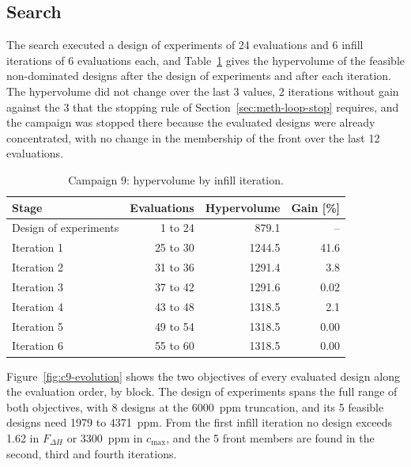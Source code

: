 \subsection{Search}
\label{sec:res-c9-search}\label{sec:res-c9-convergence}
\label{fig:c9-hv}\label{fig:c9-learning}\label{fig:c9-front-stability}

The search executed a design of experiments of 24 evaluations and 6
infill iterations of 6 evaluations each, and Table~\ref{tab:c9-hv} gives
the hypervolume of the feasible non-dominated designs after the design
of experiments and after each iteration. The hypervolume did not change over the last 3 values, 2 iterations
without gain against the 3 that the stopping rule of
Section~\ref{sec:meth-loop-stop} requires, and the campaign was stopped
there because the evaluated designs were already concentrated, with no
change in the membership of the front over the last 12 evaluations.

\begin{table}[htbp]
  \centering
  \small
  \caption{Campaign 9: hypervolume by infill iteration.}
  \label{tab:c9-hv}
  \begin{tabular}{@{}lrrr@{}}
    \toprule
    Stage & Evaluations & Hypervolume & Gain [\%] \\
    \midrule
    Design of experiments & 1 to 24 & 879.1 & -- \\
    Iteration 1 & 25 to 30 & 1244.5 & 41.6 \\
    Iteration 2 & 31 to 36 & 1291.4 & 3.8 \\
    Iteration 3 & 37 to 42 & 1291.6 & 0.02 \\
    Iteration 4 & 43 to 48 & 1318.5 & 2.1 \\
    Iteration 5 & 49 to 54 & 1318.5 & 0.00 \\
    Iteration 6 & 55 to 60 & 1318.5 & 0.00 \\
    \bottomrule
  \end{tabular}
\end{table}

Figure~\ref{fig:c9-evolution} shows the two objectives of every
evaluated design along the evaluation order, by block. The design of
experiments spans the full range of both objectives, with 8 designs
at the \SI{6000}{ppm} truncation, and its 5 feasible designs need
1979 to \SI{4371}{ppm}. From the first infill iteration no design
exceeds 1.62 in $F_{\Delta H}$ or \SI{3300}{ppm} in $c_\mathrm{max}$,
and the 5 front members are found in the second, third and fourth
iterations.

